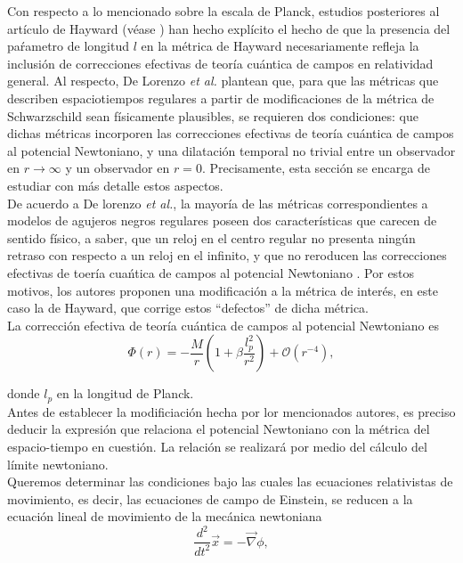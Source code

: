 \documentclass[16pt,a4paper]{article}
\numberwithin{equation}{section}
\theoremstyle{definition}
\begin{document}
Con respecto a lo mencionado sobre la escala de Planck, estudios posteriores al artículo de Hayward (véase \cite{lorenzo}) han hecho explícito el hecho de que la presencia del paŕametro de longitud $l$ en la métrica de Hayward necesariamente refleja la inclusión de correcciones efectivas de teoría cuántica de campos en relatividad general. Al respecto, De Lorenzo \emph{et al.} plantean que, para que las métricas que describen espaciotiempos regulares a partir de modificaciones de la métrica de Schwarzschild sean físicamente plausibles, se requieren dos condiciones: que dichas métricas incorporen las correcciones efectivas de teoría cuántica  de campos al potencial Newtoniano, y una dilatación temporal no trivial entre un observador en $r \to \infty$ y un observador en $r = 0$. Precisamente, esta sección se encarga de estudiar con más detalle estos aspectos.\\

De acuerdo a De lorenzo \emph{et al.}, la mayoría de las métricas correspondientes a modelos de agujeros negros regulares poseen dos características que carecen de sentido físico, a saber, que un reloj en el centro regular no presenta ningún retraso con respecto a un reloj en el infinito, y que no reroducen las correcciones efectivas de toería cuańtica de campos al potencial Newtoniano \cite{lorenzo}. Por estos motivos, los autores proponen una modificación a la métrica de interés, en este caso la de Hayward, que corrige estos ``defectos'' de dicha métrica.\\

La corrección efectiva de teoría cuántica de campos al potencial Newtoniano es
\begin{equation}
\label{newF}
\Phi (r) = -\frac{M}{r} \left( 1 + \beta \frac{l_{p}^2}{r^2} \right) + \mathcal{O}(r^{-4}),
\end{equation}

donde $l_{p}$ en la longitud de Planck.\\

Antes de establecer la modificiación hecha por lor mencionados autores, es preciso deducir la expresión que relaciona el potencial Newtoniano con la métrica del espacio-tiempo en cuestión. La relación se realizará por medio del cálculo del límite newtoniano.\\

Queremos determinar las condiciones bajo las cuales las ecuaciones relativistas de movimiento, es decir, las ecuaciones de campo de Einstein, se reducen a la ecuación lineal de movimiento de la mecánica newtoniana
\begin{equation*}
\frac{d^2}{dt^2}\vec{x} = - \vec{\nabla}\phi,
\end{equation*}
\end{document}

